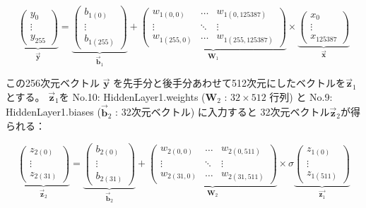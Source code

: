 \documentclass[11pt,a4paper]{ltjsarticle}
\begin{document}
\[
  \underbrace{\left(
    \begin{array}{c}
      y_{0}   \\
      \vdots    \\
      y_{255} 
    \end{array}  
  \right)}_{\vec{\bm{y}}}
  =
  \underbrace{\left(
    \begin{array}{c}
      b_{1(0)}   \\
      \vdots    \\
      b_{1(255)} 
    \end{array}  
  \right)}_{\vec{\bm{b}}_1}
  +
  \underbrace{\left(
    \begin{array}{ccc}
      w_{1(0,0)}   & \ldots & w_{1(0,125387)} \\
      \vdots    & \ddots & \vdots \\
      w_{1(255,0)} & \ldots & w_{1(255,125387)}
    \end{array}
  \right)}_{\bm{W}_1}
  \times
  \underbrace{\left(
    \begin{array}{c}
      x_{0}   \\
      \vdots    \\
      x_{125387} 
    \end{array}  
  \right)}_{\vec{\bm{x}}}
\]

\noindent
この256次元ベクトル $\vec{\bm{y}}$ を先手分と後手分あわせて512次元にしたベクトルを$\vec{\bm{z}}_1$とする。
$\vec{\bm{z}}_1$を
No.10: HiddenLayer1.weights ($\bm{W}_2$ : $32 \times 512$ 行列) と
No.9: HiddenLayer1.biases ($\vec{\bm{b}}_2$ : 32次元ベクトル) に入力すると
32次元ベクトル$\vec{\bm{z}}_2$が得られる：

\[
  \underbrace{\left(
    \begin{array}{c}
      z_{2(0)}   \\
      \vdots    \\
      z_{2(31)} 
    \end{array}  
  \right)}_{\vec{\bm{z}}_2}
  =
  \underbrace{\left(
    \begin{array}{c}
      b_{2(0)}   \\
      \vdots    \\
      b_{2(31)} 
    \end{array}  
  \right)}_{\vec{\bm{b}}_2}
  +
  \underbrace{\left(
    \begin{array}{ccc}
      w_{2(0,0)}   & \ldots & w_{2(0,511)} \\
      \vdots    & \ddots & \vdots \\
      w_{2(31,0)} & \ldots & w_{2(31,511)}
    \end{array}
  \right)}_{\bm{W}_2}
  \times
  \sigma 
  \underbrace{\left(
    \begin{array}{c}
      z_{1(0)}   \\
      \vdots    \\
      z_{1(511)} 
    \end{array}  
  \right)}_{\vec{\bm{z}_1}}
\]
\end{document}
